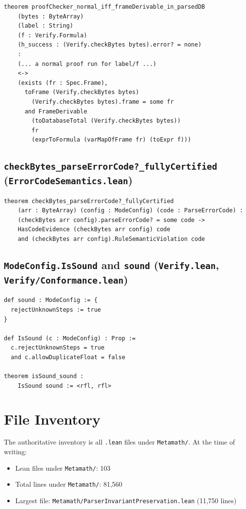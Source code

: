 \documentclass[11pt]{article}
\newcommand{\file}[1]{\texttt{#1}}
\begin{document}
\begin{lstlisting}[label=lst:parser-semantic]
theorem proofChecker_normal_iff_frameDerivable_in_parsedDB
    (bytes : ByteArray)
    (label : String)
    (f : Verify.Formula)
    (h_success : (Verify.checkBytes bytes).error? = none)
    :
    (... a normal proof run for label/f ...)
    <->
    (exists (fr : Spec.Frame),
      toFrame (Verify.checkBytes bytes)
        (Verify.checkBytes bytes).frame = some fr
      and FrameDerivable
        (toDatabaseTotal (Verify.checkBytes bytes))
        fr
        (exprToFormula (varMapOfFrame fr) (toExpr f)))
\end{lstlisting}

\subsection{\texttt{checkBytes\_parseErrorCode?\_fullyCertified} (\file{ErrorCodeSemantics.lean})}

\begin{lstlisting}[label=lst:errorcode]
theorem checkBytes_parseErrorCode?_fullyCertified
    (arr : ByteArray) (config : ModeConfig) (code : ParseErrorCode) :
    (checkBytes arr config).parseErrorCode? = some code ->
    HasCodeEvidence (checkBytes arr config) code
    and (checkBytes arr config).RuleSemanticViolation code
\end{lstlisting}

\subsection{\texttt{ModeConfig.IsSound} and \texttt{sound} (\file{Verify.lean}, \file{Verify/Conformance.lean})}

\begin{lstlisting}[label=lst:config]
def sound : ModeConfig := {
  rejectUnknownSteps := true
}

def IsSound (c : ModeConfig) : Prop :=
  c.rejectUnknownSteps = true
  and c.allowDuplicateFloat = false

theorem isSound_sound :
    IsSound sound := <rfl, rfl>
\end{lstlisting}

\section{File Inventory}
\label{app:inventory}

The authoritative inventory is all \texttt{.lean} files under
\texttt{Metamath/}.  At the time of writing:
\begin{itemize}[leftmargin=2em]
\item Lean files under \texttt{Metamath/}: 103
\item Total lines under \texttt{Metamath/}: 81{,}560
\item Largest file: \texttt{Metamath/ParserInvariantPreservation.lean} (11{,}750 lines)
\end{itemize}
\end{document}
